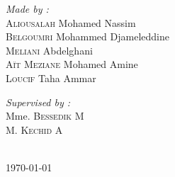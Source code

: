 {\begin{titlepage}
  \noindent
  \begin{minipage}{0.6\textwidth}
      \vspace{-7mm}
    \begin{flushleft} \large
      \emph{Made by :}\\
      \textsc{Aliousalah} Mohamed Nassim\\
      \textsc{Belgoumri} Mohammed Djameleddine\\
      \textsc{Meliani} Abdelghani\\
      \textsc{Aït Meziane} Mohamed Amine\\
      \textsc{Loucif} Taha Ammar\\
    \end{flushleft}
  \end{minipage}
  \begin{minipage}{0.3\textwidth}
    \begin{flushright} \large
      \begin{flushleft} \large
      \emph{Supervised by :} \\
      {
        Mme. \textsc{Bessedik} M\\[0.1cm]
        M. \textsc{Kechid} A\\[0.1cm]
      }
      \end{flushleft}

    \end{flushright}
  \end{minipage}\\[1cm]


  \vspace{20mm}
  {\large \today}        
  \end{titlepage}
  \restoregeometry
}